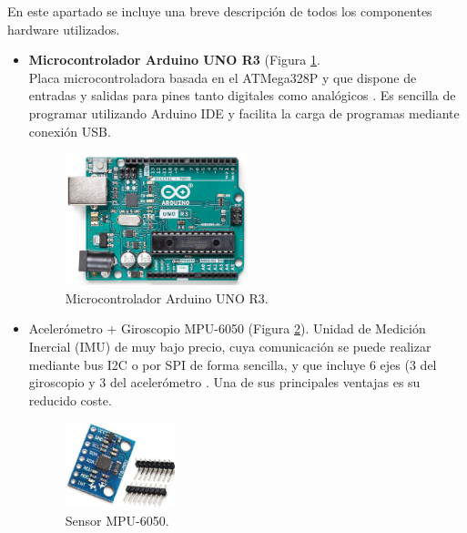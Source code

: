 En este apartado se incluye una breve descripción de todos los componentes hardware utilizados.
\begin{itemize}
    \item \textbf{Microcontrolador Arduino UNO R3} (Figura \ref{fig:arduinoUNO}.\\
    Placa microcontroladora basada en el ATMega328P y que dispone de entradas y salidas para pines tanto digitales como analógicos \cite{ArduinoUNO82:online}. Es sencilla de programar utilizando Arduino IDE y facilita la carga de programas mediante conexión USB.

    \begin{figure}[h]
        \centering
        \includegraphics[width=0.5\textwidth]{img/4.TecnicasHerramientas/ArduinoUNO.png}
        \caption{Microcontrolador Arduino UNO R3. \cite{ArduinoUNO82:online}}
        \label{fig:arduinoUNO}
    \end{figure}
    
    \item Acelerómetro + Giroscopio MPU-6050 (Figura \ref{fig:mpu}).
    Unidad de Medición Inercial (IMU) de muy bajo precio, cuya comunicación se puede realizar mediante bus I2C o por SPI de forma sencilla, y que incluye 6 ejes (3 del giroscopio y 3 del acelerómetro \cite{MPU605015:online}. Una de sus principales ventajas es su reducido coste.
    
    \begin{figure}[h]
        \centering
        \includegraphics[width=0.3\textwidth]{img/4.TecnicasHerramientas/MPU6050.png}
        \caption{Sensor MPU-6050. \cite{MPU6050Amazon396:online}}
        \label{fig:mpu}
    \end{figure}
    

\end{itemize}
